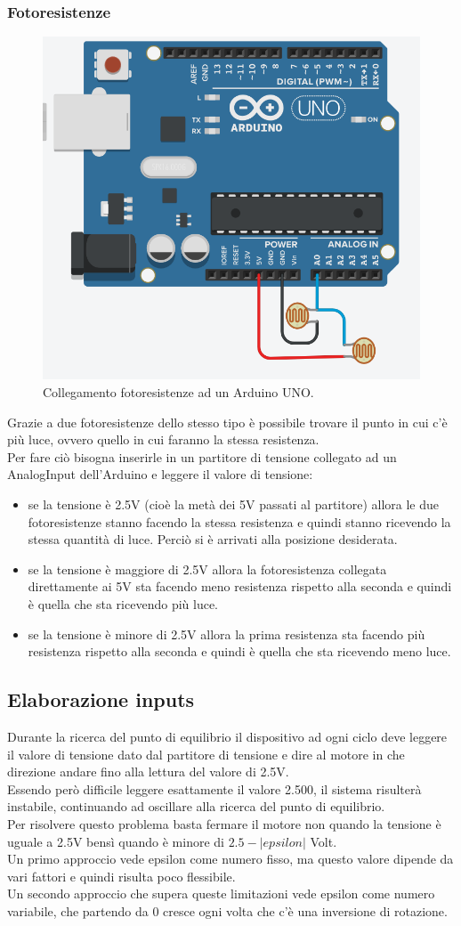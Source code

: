 \documentclass[12pt,oneside,a4paper]{article}
\begin{document}
\subsubsection{Fotoresistenze}

\begin{figure}[!htb]
    \centering
    \includegraphics[width=0.4\linewidth]{figures/photoresistors}
    \caption{Collegamento fotoresistenze ad un Arduino UNO.}
\end{figure}
Grazie a due fotoresistenze dello stesso tipo è possibile trovare il punto in cui c'è più luce, ovvero quello in cui faranno la stessa resistenza.
\\Per fare ciò bisogna inserirle in un partitore di tensione collegato ad un AnalogInput dell'Arduino e leggere il valore di tensione:
\begin{itemize}
    \item se la tensione è 2.5V (cioè la metà dei 5V passati al partitore) allora le due fotoresistenze stanno facendo la stessa resistenza e quindi stanno ricevendo la stessa quantità di luce. Perciò si è arrivati alla posizione desiderata.
    \item se la tensione è maggiore di 2.5V allora la fotoresistenza collegata direttamente ai 5V sta facendo meno resistenza rispetto alla seconda e quindi è quella che sta ricevendo più luce.
    \item se la tensione è minore di 2.5V allora la prima resistenza sta facendo più resistenza rispetto alla seconda e quindi è quella che sta ricevendo meno luce.
\end{itemize}

\subsection{Elaborazione inputs}
Durante la ricerca del punto di equilibrio il dispositivo ad ogni ciclo deve leggere il valore di tensione dato dal partitore di tensione e dire al motore in che direzione andare fino alla lettura del valore di 2.5V.
\\Essendo però difficile leggere esattamente il valore 2.500, il sistema risulterà instabile, continuando ad oscillare alla ricerca del punto di equilibrio.
\\Per risolvere questo problema basta fermare il motore non quando la tensione è uguale a 2.5V bensì quando è minore di $2.5 - |epsilon|$ Volt.
\\Un primo approccio vede epsilon come numero fisso, ma questo valore dipende da vari fattori e quindi risulta poco flessibile.
\\Un secondo approccio che supera queste limitazioni vede epsilon come numero variabile, che partendo da 0 cresce ogni volta che c'è una inversione di rotazione.
\end{document}
